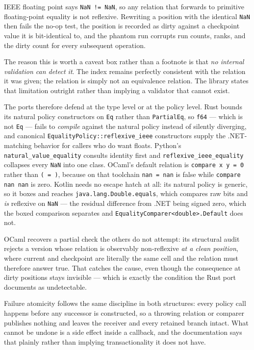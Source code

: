 \documentclass[11pt,twoside,openright]{book}
\newcommand{\code}[1]{\texorpdfstring{\textcolor{d7ink}{\texttt{#1}}}{#1}}
\begin{document}
\begin{caveatbox}
IEEE floating point says \code{NaN != NaN}, so any relation that forwards to
primitive floating-point equality is not reflexive. Rewriting a position with
the identical \code{NaN} then fails the no-op test, the position is recorded as
dirty against a checkpoint value it is bit-identical to, and the phantom run
corrupts run counts, ranks, and the dirty count for every subsequent
operation.

The reason this is worth a caveat box rather than a footnote is that
\emph{no internal validation can detect it}. The index remains perfectly
consistent with the relation it was given; the relation is simply not an
equivalence relation. The library states that limitation outright rather than
implying a validator that cannot exist.

The ports therefore defend at the type level or at the policy level. Rust
bounds its natural policy constructors on \code{Eq} rather than
\code{PartialEq}, so \code{f64} --- which is not \code{Eq} --- fails to
\emph{compile} against the natural policy instead of silently diverging, and
canonical \code{EqualityPolicy::reflexive\_ieee} constructors supply the
.NET-matching behavior for callers who do want floats.
Python's \code{natural\_value\_equality} consults identity first and
\code{reflexive\_ieee\_equality} collapses every \code{NaN} into one class.
OCaml's default relation is \code{compare x y = 0} rather than \code{( = )},
because on that toolchain \code{nan = nan} is false while \code{compare nan nan}
is zero. Kotlin needs no escape hatch at all: its natural policy is generic, so
it boxes and reaches \code{java.lang.Double.equals}, which compares raw bits and
\emph{is} reflexive on \code{NaN} --- the residual difference from .NET being
signed zero, which the boxed comparison separates and
\code{EqualityComparer<double>.Default} does not.

OCaml recovers a partial check the others do not attempt: its structural audit
rejects a version whose relation is observably non-reflexive \emph{at a clean
position}, where current and checkpoint are literally the same cell and the
relation must therefore answer true. That catches the cause, even though the
consequence at dirty positions stays invisible --- which is exactly the
condition the Rust port documents as undetectable.
\end{caveatbox}

Failure atomicity follows the same discipline in both structures: every policy
call happens before any successor is constructed, so a throwing relation or
comparer publishes nothing and leaves the receiver and every retained branch
intact. What cannot be undone is a side effect inside a callback, and the
documentation says that plainly rather than implying transactionality it does
not have.
\end{document}
